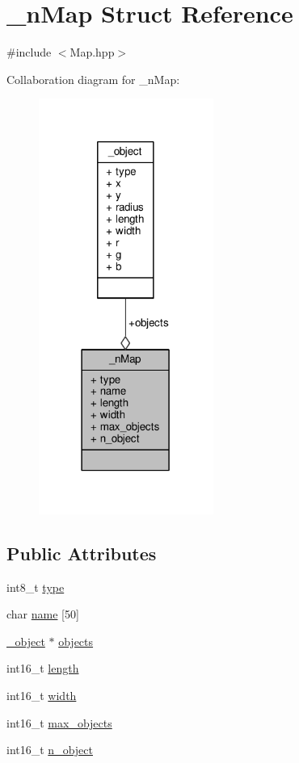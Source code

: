 \hypertarget{struct__n_map}{}\section{\+\_\+n\+Map Struct Reference}
\label{struct__n_map}


{\ttfamily \#include $<$Map.\+hpp$>$}



Collaboration diagram for \+\_\+n\+Map\+:\nopagebreak
\begin{figure}[H]
\begin{center}
\leavevmode
\includegraphics[width=162pt]{struct__n_map__coll__graph}
\end{center}
\end{figure}
\subsection*{Public Attributes}
\begin{DoxyCompactItemize}
\item 
int8\+\_\+t \hyperlink{struct__n_map_a79dda563cc2d4f715a9185f1a970150b}{type}
\item 
char \hyperlink{struct__n_map_a138f2aaca24cdaf5ec466c7889b21c15}{name} \mbox{[}50\mbox{]}
\item 
\hyperlink{struct__object}{\+\_\+object} $\ast$ \hyperlink{struct__n_map_ac3f3bf64347ac2accba1e388da7bfa07}{objects}
\item 
int16\+\_\+t \hyperlink{struct__n_map_a772868c89751c4a27a7eccf076df5fc6}{length}
\item 
int16\+\_\+t \hyperlink{struct__n_map_a4e83d0ff1af678de2d5b318e549d0ec5}{width}
\item 
int16\+\_\+t \hyperlink{struct__n_map_a4570178b4b02516d89d54fc7be2ccd4f}{max\+\_\+objects}
\item 
int16\+\_\+t \hyperlink{struct__n_map_ac41305de4abf61844a81b7a67992f2a8}{n\+\_\+object}
\end{DoxyCompactItemize}


